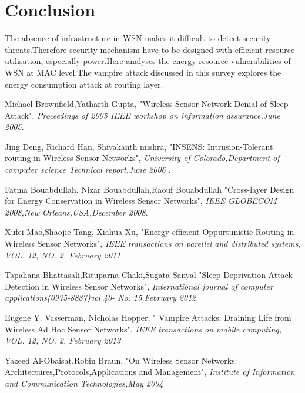 \documentclass[twocolumn,10pt]{article}
\begin{document}
\section{Conclusion}

The absence of infrastructure in WSN makes  it difficult to detect security threats.Therefore security mechanism have to be designed with efficient resource utilisation, especially power.Here analyses the energy resource vulnerabilities of WSN at MAC level.The vampire attack discussed in this survey explores the energy consumption attack at routing layer.

\begin{thebibliography}{99}

 Michael Brownfield,Yatharth Gupta,
 \newblock "Wireless Sensor Network Denial of Sleep Attack",
 \newblock \emph{Proceedings of 2005 IEEE workshop on information assurance,June 2005}.

 
  Jing Deng, Richard Han, Shivakanth mishra,
 \newblock "INSENS: Intrusion-Tolerant routing in Wireless Sensor Networks",
 \newblock \emph{University of Colorado,Department of computer science Technical report,June 2006 }.

Fatma Bouabdullah, Nizar Bouabdullah,Raouf Bouabdullah 
 \newblock "Cross-layer Design for Energy Conservation in  Wireless Sensor Networks",
 \newblock \emph{IEEE GLOBECOM 2008,New Orleans,USA,December 2008}.

 Xufei Mao,Shaojie Tang, Xiahua Xu,
 \newblock "Energy efficient Oppurtunistic Routing in Wireless Sensor Networks",
 \newblock \emph{IEEE transactions on parellel and distributed systems, VOL. 12, NO. 2, February 2011 }

Tapaliana Bhattasali,Rituparna Chaki,Sugata Sanyal
 \newblock "Sleep Deprivation Attack Detection in Wireless Sensor Networks",
 \newblock \emph{International journal of computer applications(0975-8887)vol 40- No: 15,February 2012 }
 
 Eugene Y. Vasserman, Nicholas Hopper,
 \newblock " Vampire Attacks: Draining Life from Wireless Ad Hoc Sensor Networks",
 \newblock \emph{IEEE transactions on mobile computing, VOL. 12, NO. 2, February 2013 }
 
  Yazeed Al-Obaisat,Robin Braun,
 \newblock "On Wireless Sensor Networks: Architectures,Protocols,Applications and Management",
 \newblock \emph{Institute of Information and Communication Technologies,May 2004 }
   
\end{thebibliography}
\end{document}
